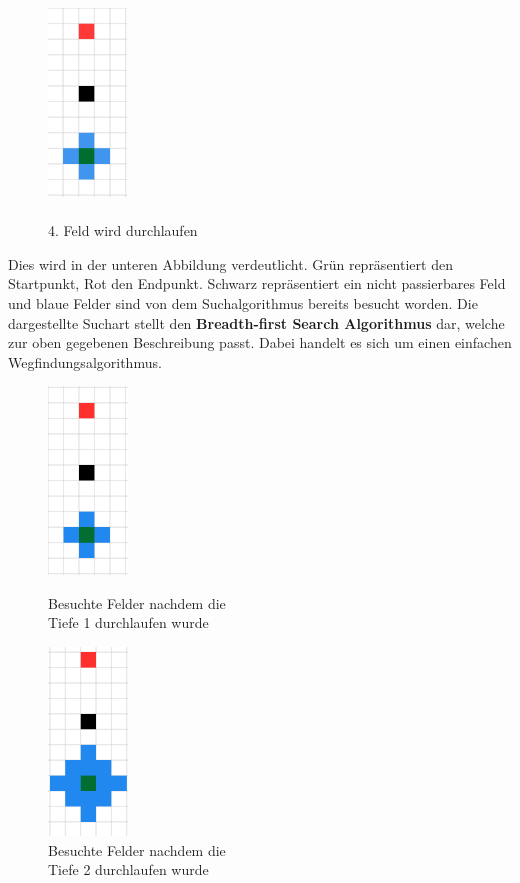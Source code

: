{{\begin{figure}[H]
			\begin{minipage}{0.5\textwidth}
				\centering
				\includegraphics[height=5cm]{Bilder/pathfinding_procedure_4.png}
				\caption{\\ 4. Feld wird durchlaufen}
				\label{pic:pathfinding_procedure_4}
			\end{minipage}
		\end{figure}
		
		
		Dies wird in der unteren Abbildung verdeutlicht. Grün repräsentiert den Startpunkt, Rot den Endpunkt. Schwarz repräsentiert ein nicht passierbares Feld und blaue Felder sind von dem Suchalgorithmus bereits besucht worden. 
		Die dargestellte Suchart stellt den \textbf{Breadth-first Search Algorithmus} dar, welche zur oben gegebenen Beschreibung passt. Dabei handelt es sich um einen einfachen Wegfindungsalgorithmus.
		
		\begin{figure}[H]
			\begin{minipage}{0.5\textwidth}
				\centering
				\includegraphics[height=5cm]{Bilder/pathfinding_tiefe1.png}
				\caption{Besuchte Felder nachdem die \\ Tiefe 1 durchlaufen wurde} %
				\label{pic:pathtiefe1}
			\end{minipage}
			\begin{minipage}{0.5\textwidth}
				\centering
				\includegraphics[height=5cm]{Bilder/pathfinding_tiefe2.png}
				\caption{Besuchte Felder nachdem die \\ Tiefe 2 durchlaufen wurde} %
				\label{pic:pathtiefe2}
			\end{minipage}
		\end{figure}	
	
}}
